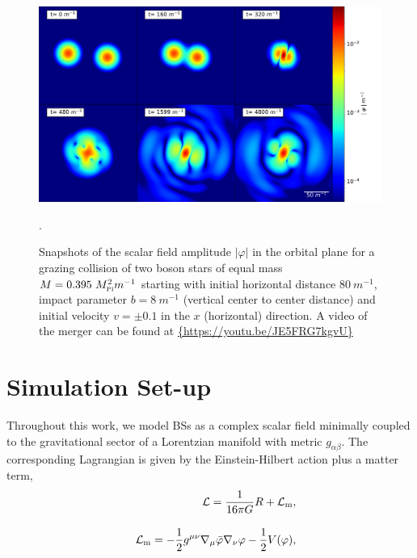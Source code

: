 \documentclass[aps,twocolumn,nofootinbib,superscriptaddress,amsfonts,floatfix
]{revtex4-1} %
\newcommand{\mpl}{M_{\mbox{\tiny Pl}}}
\begin{document}
\begin{figure}[t]
\begin{center}
\href{https://youtu.be/JE5FRG7kgvU}{
    {\includegraphics[width=2\columnwidth]{modphi_plot_axes_log.png}}
    }
\caption{
    Snapshots of the scalar field amplitude $|\varphi|$
    in the orbital plane for a
    grazing collision of two boson stars
    of equal mass $M=0.395~\mpl^2 m^{-1}$ starting with initial horizontal distance $80~m^{-1}$, impact
    parameter $b=8~m^{-1}$ (vertical center to center distance) and initial velocity $v=\pm 0.1$
    in the $x$ (horizontal) direction. A video of the merger can be found at \url{{https://youtu.be/JE5FRG7kgvU}}}.
\label{fig:Panellog}
\end{center}
\end{figure}

\section{Simulation Set-up}\label{section:inital_data} 

Throughout this work, we model BSs as a complex scalar field
minimally coupled to the gravitational sector of a Lorentzian
manifold with metric $g_{\alpha\beta}$. The corresponding
Lagrangian is given by the Einstein-Hilbert action plus a
matter term,
%
\begin{eqnarray}
  &&\mathcal{L} = \frac{1}{16\pi G}R + \mathcal{L}_{\rm m},
  \\[10pt]
  &&\mathcal{L}_{\rm m} =-\frac{1}{2}g^{\mu\nu}\nabla_{\mu}{\bar{\varphi}}\nabla_{\nu}{\varphi}-\frac{1}{2} V(\varphi),
\end{eqnarray}
\end{document}
